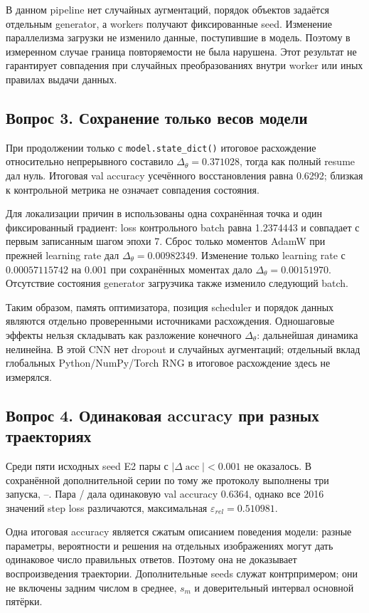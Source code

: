В данном pipeline нет случайных аугментаций, порядок объектов задаётся отдельным generator, а workers получают фиксированные seed. Изменение параллелизма загрузки не изменило данные, поступившие в модель. Поэтому в измеренном случае граница повторяемости не была нарушена. Этот результат не гарантирует совпадения при случайных преобразованиях внутри worker или иных правилах выдачи данных.

\subsection{Вопрос 3. Сохранение только весов модели}\label{cf:3}
При продолжении только с \texttt{model.state\_dict()} итоговое расхождение  относительно непрерывного  составило $\Delta_\theta=0.371028$, тогда как полный resume дал нуль. Итоговая val accuracy усечённого восстановления равна 0.6292; близкая к контрольной метрика не означает совпадения состояния.

Для локализации причин в  использованы одна сохранённая точка и один фиксированный градиент: loss контрольного batch равна 1.2374443 и совпадает с первым записанным шагом эпохи 7. Сброс только моментов AdamW при прежней learning rate дал $\Delta_\theta=0.00982349$. Изменение только learning rate с $0.00057115742$ на $0.001$ при сохранённых моментах дало $\Delta_\theta=0.00151970$. Отсутствие состояния generator загрузчика также изменило следующий batch.

Таким образом, память оптимизатора, позиция scheduler и порядок данных являются отдельно проверенными источниками расхождения. Одношаговые эффекты нельзя складывать как разложение конечного $\Delta_\theta$: дальнейшая динамика нелинейна. В этой CNN нет dropout и случайных аугментаций; отдельный вклад глобальных Python/NumPy/Torch RNG в итоговое расхождение здесь не измерялся.

\subsection{Вопрос 4. Одинаковая accuracy при разных траекториях}\label{cf:4}
Среди пяти исходных seed E2 пары с $|\Delta\operatorname{acc}|<0.001$ не оказалось. В сохранённой дополнительной серии по тому же протоколу выполнены три запуска, --. Пара / дала одинаковую val accuracy 0.6364, однако все 2016 значений step loss различаются, максимальная $\varepsilon_{rel}=0.510981$.

Одна итоговая accuracy является сжатым описанием поведения модели: разные параметры, вероятности и решения на отдельных изображениях могут дать одинаковое число правильных ответов. Поэтому она не доказывает воспроизведения траектории. Дополнительные seeds служат контрпримером; они не включены задним числом в среднее, $s_m$ и доверительный интервал основной пятёрки.

